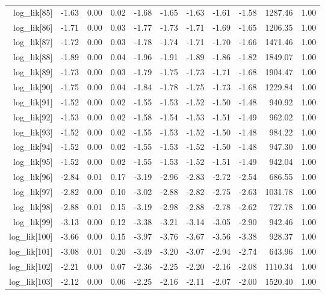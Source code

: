 \begin{table}[ht]
\begin{tabular}{rrrrrrrrrrr}
  log\_lik[85] & -1.63 & 0.00 & 0.02 & -1.68 & -1.65 & -1.63 & -1.61 & -1.58 & 1287.46 & 1.00 \\ 
  log\_lik[86] & -1.71 & 0.00 & 0.03 & -1.77 & -1.73 & -1.71 & -1.69 & -1.65 & 1206.35 & 1.00 \\ 
  log\_lik[87] & -1.72 & 0.00 & 0.03 & -1.78 & -1.74 & -1.71 & -1.70 & -1.66 & 1471.46 & 1.00 \\ 
  log\_lik[88] & -1.89 & 0.00 & 0.04 & -1.96 & -1.91 & -1.89 & -1.86 & -1.82 & 1849.07 & 1.00 \\ 
  log\_lik[89] & -1.73 & 0.00 & 0.03 & -1.79 & -1.75 & -1.73 & -1.71 & -1.68 & 1904.47 & 1.00 \\ 
  log\_lik[90] & -1.75 & 0.00 & 0.04 & -1.84 & -1.78 & -1.75 & -1.73 & -1.68 & 1229.84 & 1.00 \\ 
  log\_lik[91] & -1.52 & 0.00 & 0.02 & -1.55 & -1.53 & -1.52 & -1.50 & -1.48 & 940.92 & 1.00 \\ 
  log\_lik[92] & -1.53 & 0.00 & 0.02 & -1.58 & -1.54 & -1.53 & -1.51 & -1.49 & 962.02 & 1.00 \\ 
  log\_lik[93] & -1.52 & 0.00 & 0.02 & -1.55 & -1.53 & -1.52 & -1.50 & -1.48 & 984.22 & 1.00 \\ 
  log\_lik[94] & -1.52 & 0.00 & 0.02 & -1.55 & -1.53 & -1.52 & -1.50 & -1.48 & 947.30 & 1.00 \\ 
  log\_lik[95] & -1.52 & 0.00 & 0.02 & -1.55 & -1.53 & -1.52 & -1.51 & -1.49 & 942.04 & 1.00 \\ 
  log\_lik[96] & -2.84 & 0.01 & 0.17 & -3.19 & -2.96 & -2.83 & -2.72 & -2.54 & 686.55 & 1.00 \\ 
  log\_lik[97] & -2.82 & 0.00 & 0.10 & -3.02 & -2.88 & -2.82 & -2.75 & -2.63 & 1031.78 & 1.00 \\ 
  log\_lik[98] & -2.88 & 0.01 & 0.15 & -3.19 & -2.98 & -2.88 & -2.78 & -2.62 & 727.78 & 1.00 \\ 
  log\_lik[99] & -3.13 & 0.00 & 0.12 & -3.38 & -3.21 & -3.14 & -3.05 & -2.90 & 942.46 & 1.00 \\ 
  log\_lik[100] & -3.66 & 0.00 & 0.15 & -3.97 & -3.76 & -3.67 & -3.56 & -3.38 & 928.37 & 1.00 \\ 
  log\_lik[101] & -3.08 & 0.01 & 0.20 & -3.49 & -3.20 & -3.07 & -2.94 & -2.74 & 643.96 & 1.00 \\ 
  log\_lik[102] & -2.21 & 0.00 & 0.07 & -2.36 & -2.25 & -2.20 & -2.16 & -2.08 & 1110.34 & 1.00 \\ 
  log\_lik[103] & -2.12 & 0.00 & 0.06 & -2.25 & -2.16 & -2.11 & -2.07 & -2.00 & 1520.40 & 1.00 \\ 

\end{tabular}
\end{table}
